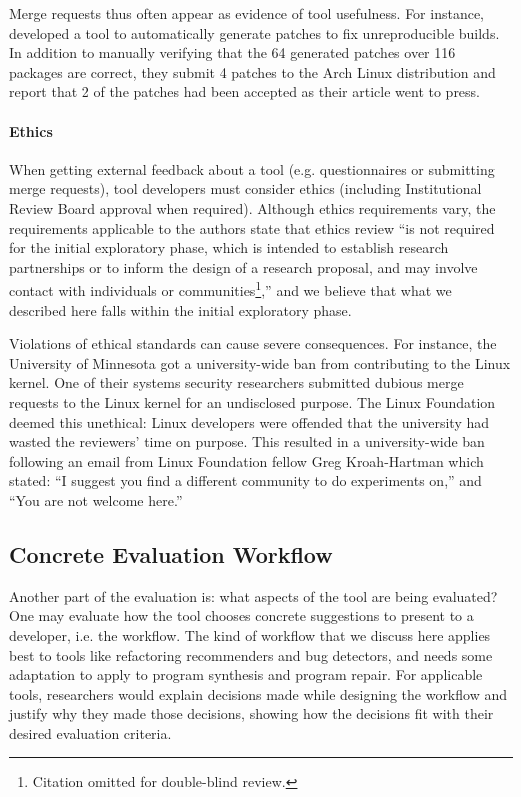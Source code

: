 Merge requests thus often appear as evidence of tool usefulness.
For instance,  developed a tool
to automatically generate patches to fix unreproducible builds.
In addition to manually verifying that the 64 generated patches over 116 packages
are correct, they submit 4 patches to the Arch Linux distribution and report
that 2 of the patches had been accepted as their article went to press.

\paragraph{Ethics} When getting external feedback about a tool (e.g. questionnaires or
submitting merge requests), tool developers must consider ethics
(including Institutional Review Board approval when required). Although
ethics requirements vary, the requirements
applicable to the authors state that ethics review 
``is not required for the initial exploratory phase, which is intended to establish research partnerships or to inform the design of a research proposal, and may involve contact with individuals or communities\footnote{Citation omitted for double-blind review.},'' and we believe that what we
described here falls within the initial exploratory phase.

Violations of ethical
standards can cause severe consequences. For instance, the
University of Minnesota got a university-wide ban from contributing to
the Linux kernel. One of their systems security researchers submitted
dubious merge requests to the Linux kernel for an undisclosed purpose. 
The Linux Foundation deemed this
unethical: Linux developers were offended that the university had 
wasted the reviewers' time on purpose. This resulted in a university-wide ban
following an email from Linux Foundation fellow Greg Kroah-Hartman
which stated: ``I suggest you find a different community to do
experiments on,'' and ``You are not welcome
here.''~\cite{minnesota_banned}

\subsection{Concrete Evaluation Workflow}
Another part of the evaluation is: what aspects of the tool are
being evaluated?
One may evaluate how the tool chooses concrete
suggestions to present to a developer, i.e. the workflow. 
The kind of workflow that we discuss here applies
best to tools like refactoring recommenders and bug detectors, and
needs some adaptation to apply to program synthesis and program repair.
For applicable tools, researchers would explain decisions made while
designing the workflow and justify why they made those decisions, showing how the
decisions fit
with their desired evaluation criteria.

